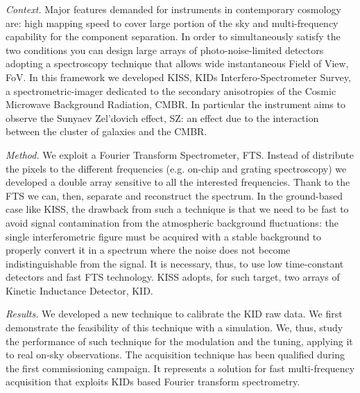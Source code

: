 \color{black}

\emph{Context.} Major features demanded for instruments in contemporary cosmology are: high mapping speed to cover large portion of the sky and multi-frequency capability for the component separation. In order to simultaneously satisfy the two conditions you can design large arrays of photo-noise-limited detectors adopting a spectroscopy technique that allows wide instantaneous Field of View, FoV. In this framework we developed KISS, KIDs Interfero-Spectrometer Survey, a spectrometric-imager dedicated to the secondary anisotropies of the Cosmic Microwave Background Radiation, CMBR. In particular the instrument aims to observe the Sunyaev Zel'dovich effect, SZ: an effect due to the interaction between the cluster of galaxies and the CMBR.

\emph{Method.} We exploit a Fourier Transform Spectrometer, FTS. Instead of distribute the pixels to the different frequencies (e.g. on-chip and grating spectroscopy) we developed a double array sensitive to all the interested frequencies. Thank to the FTS we can, then, separate and reconstruct the spectrum. In the ground-based case like KISS, the drawback from such a technique is that we need to be fast to avoid signal contamination from the atmospheric background fluctuations: the single interferometric figure must be acquired with a stable background to properly convert it in a spectrum where the noise does not become indistinguishable from the signal. It is necessary, thus, to use low time-constant detectors and fast FTS technology. KISS adopts, for such target, two arrays of Kinetic Inductance Detector, KID.

\emph{Results.} We developed a new technique to calibrate the KID raw data. We first demonstrate the feasibility of this technique with a simulation. We, thus, study the performance of such technique for the modulation and the tuning, applying it to real on-sky observations. The acquisition technique has been qualified during the first commissioning campaign. It represents a solution for fast multi-frequency acquisition that exploits KIDs based Fourier transform spectrometry.